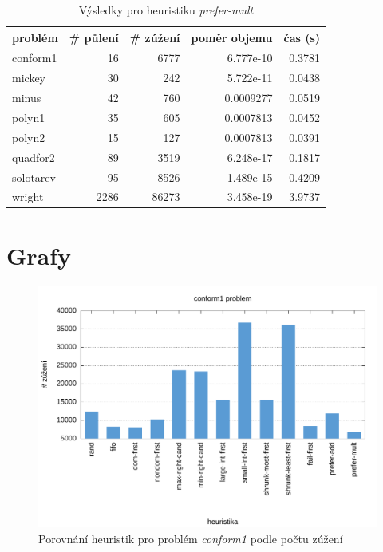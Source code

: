 {\begin{table}[H]
\centering
\begin{tabular}{lrrrr}
\hline
problém & \# půlení & \# zúžení & poměr objemu & čas (s) \\ \hline
conform1 & 16 & 6777 & 6.777e-10 & 0.3781 \\
mickey & 30 & 242 & 5.722e-11 & 0.0438 \\
minus & 42 & 760 & 0.0009277 & 0.0519 \\
polyn1 & 35 & 605 & 0.0007813 & 0.0452 \\
polyn2 & 15 & 127 & 0.0007813 & 0.0391 \\
quadfor2 & 89 & 3519 & 6.248e-17 & 0.1817 \\
solotarev & 95 & 8526 & 1.489e-15 & 0.4209 \\
wright & 2286 & 86273 & 3.458e-19 & 3.9737 \\
\end{tabular}
\caption{Výsledky pro heuristiku \emph{prefer-mult}}
\label{prefer-mult}
\end{table}







\section{Grafy}
\label{ch:charts}
\begin{figure}[H]
\centering
\includegraphics[scale=0.68]{chart/conform1_nar.pdf}
\caption{Porovnání heuristik pro problém \emph{conform1} podle počtu zúžení}
\end{figure}

}
